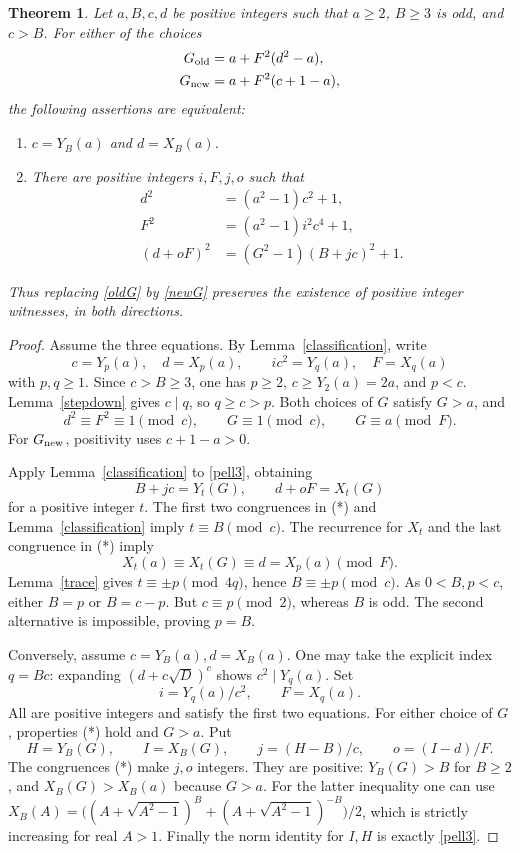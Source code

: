 \documentclass[11pt]{article}
\newtheorem{theorem}{Theorem}
\begin{document}
\begin{theorem}\label{odd}
Let \(a,B,c,d\) be positive integers such that
\(a\ge2\), \(B\ge3\) is odd, and \(c>B\).
For either of the choices
\begin{align}
 G_{\rm old}&=a+F^2(d^2-a),\label{oldG}\\
 G_{\rm new}&=a+F^2(c+1-a),\label{newG}
\end{align}
the following assertions are equivalent:
\begin{enumerate}
\item \(c=Y_B(a)\) and \(d=X_B(a)\).
\item There are positive integers \(i,F,j,o\) such that
\begin{align}
 d^2&=(a^2-1)c^2+1,\label{pell1}\\
 F^2&=(a^2-1)i^2c^4+1,\label{pell2}\\
 (d+oF)^2&=(G^2-1)(B+jc)^2+1.\label{pell3}
\end{align}
\end{enumerate}
Thus replacing \eqref{oldG} by \eqref{newG} preserves the
existence of positive integer witnesses, in both directions.
\end{theorem}
\begin{proof}
Assume the three equations.  By Lemma~\ref{classification}, write
\[
    c=Y_p(a),\quad d=X_p(a),\qquad
    ic^2=Y_q(a),\quad F=X_q(a)
\]
with \(p,q\ge1\).  Since \(c>B\ge3\), one has \(p\ge2\),
\(c\ge Y_2(a)=2a\), and \(p<c\).
Lemma~\ref{stepdown} gives \(c\mid q\), so \(q\ge c>p\).
Both choices of \(G\) satisfy \(G>a\), and
\[
 d^2\equiv F^2\equiv1\pmod c,
 \qquad G\equiv1\pmod c,
 \qquad G\equiv a\pmod F.                         \tag{*}
\]
For \(G_{\rm new}\), positivity uses \(c+1-a>0\).

Apply Lemma~\ref{classification} to \eqref{pell3}, obtaining
\[
                 B+jc=Y_t(G),\qquad d+oF=X_t(G)
\]
for a positive integer \(t\).  The first two congruences in (*)
and Lemma~\ref{classification} imply \(t\equiv B\pmod c\).
The recurrence for \(X_t\) and the last congruence in (*) imply
\[
                  X_t(a)\equiv X_t(G)\equiv d=X_p(a)\pmod F.
\]
Lemma~\ref{trace} gives \(t\equiv\pm p\pmod {4q}\), hence
\(B\equiv\pm p\pmod c\).  As \(0<B,p<c\), either \(B=p\)
or \(B=c-p\).  But \(c\equiv p\pmod2\), whereas \(B\) is odd.
The second alternative is impossible, proving \(p=B\).

Conversely, assume \(c=Y_B(a),d=X_B(a)\).
One may take the explicit index \(q=Bc\): expanding
\((d+c\sqrt D)^c\) shows \(c^2\mid Y_q(a)\).
Set
\[
                   i=Y_q(a)/c^2,\qquad F=X_q(a).
\]
All are positive integers and satisfy the first two equations.
For either choice of \(G\), properties (*) hold and \(G>a\).
Put
\[
             H=Y_B(G),\qquad I=X_B(G),\qquad
             j=(H-B)/c,\qquad o=(I-d)/F.
\]
The congruences (*) make \(j,o\) integers.  They are positive:
\(Y_B(G)>B\) for \(B\ge2\), and \(X_B(G)>X_B(a)\)
because \(G>a\).  For the latter inequality one can use
\(X_B(A)=\bigl((A+\sqrt{A^2-1})^B+
(A+\sqrt{A^2-1})^{-B}\bigr)/2\), which is strictly increasing
for real \(A>1\).  Finally the norm identity for \(I,H\)
is exactly \eqref{pell3}.
\end{proof}
\end{document}
